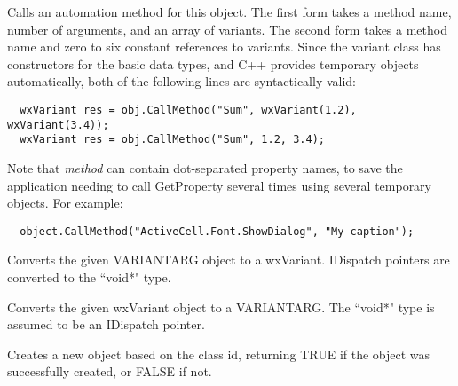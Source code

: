
Calls an automation method for this object. The first form takes a method name, number of
arguments, and an array of variants. The second form takes a method name and zero to six
constant references to variants. Since the variant class has constructors for the basic
data types, and C++ provides temporary objects automatically, both of the following lines
are syntactically valid:

{\small
\begin{verbatim}
  wxVariant res = obj.CallMethod("Sum", wxVariant(1.2), wxVariant(3.4));
  wxVariant res = obj.CallMethod("Sum", 1.2, 3.4);
\end{verbatim}
}

Note that {\it method} can contain dot-separated property names, to save the application
needing to call GetProperty several times using several temporary objects. For example:

{\small
\begin{verbatim}
  object.CallMethod("ActiveCell.Font.ShowDialog", "My caption");
\end{verbatim}
}

\label{wxautomationobjectconvertoletovariant}


Converts the given VARIANTARG object to a wxVariant. IDispatch pointers are converted to the ``void*" type.

\label{wxautomationobjectconvertvarianttoole}


Converts the given wxVariant object to a VARIANTARG. The ``void*" type is assumed to be an
IDispatch pointer.

\label{wxautomationobjectcreateinstance}


Creates a new object based on the class id, returning TRUE if the object was successfully created,
or FALSE if not.

\label{wxautomationobjectgetdispatchptr}


